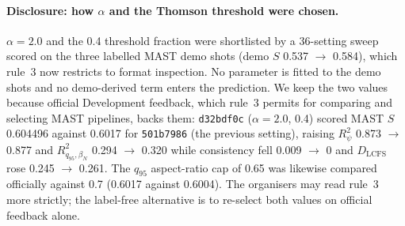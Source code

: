 \documentclass{article}
\newcommand{\sha}[1]{\texttt{#1}}
\begin{document}
\paragraph{Disclosure: how $\alpha$ and the Thomson threshold were chosen.} $\alpha = 2.0$ and the 0.4 threshold
fraction were shortlisted by a 36-setting sweep scored on the three labelled MAST demo shots (demo $S$ 0.537 $\to$
0.584), which rule~3 now restricts to format inspection. No parameter is fitted to the demo shots and no demo-derived
term enters the prediction. We keep the two values because official Development feedback, which rule~3 permits for
comparing and selecting MAST pipelines, backs them: \sha{d32bdf0c} ($\alpha = 2.0$, 0.4) scored MAST $S$ 0.604496
against 0.6017 for \sha{501b7986} (the previous setting), raising $R^2_\psi$ 0.873 $\to$ 0.877 and $R^2_{q_{95},\beta_N}$
0.294 $\to$ 0.320 while consistency fell 0.009 $\to$ 0 and $D_{\mathrm{LCFS}}$ rose 0.245 $\to$ 0.261. The $q_{95}$
aspect-ratio cap of 0.65 was likewise compared officially against 0.7 (0.6017 against 0.6004). The organisers may read
rule~3 more strictly; the label-free alternative is to re-select both values on official feedback alone.
\end{document}
